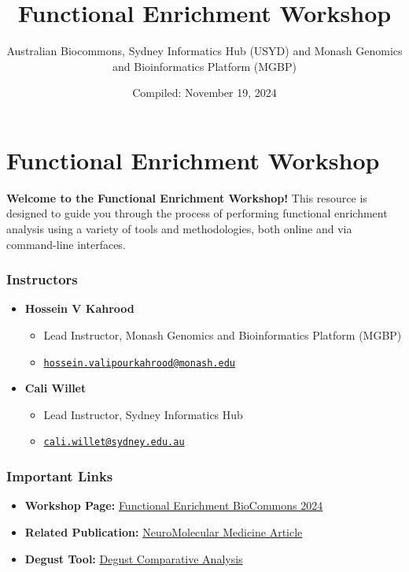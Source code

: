 \documentclass[
]{book}
\title{Functional Enrichment Workshop}
\author{Australian Biocommons, Sydney Informatics Hub (USYD) and Monash Genomics and Bioinformatics Platform (MGBP)}
\date{Compiled: November 19, 2024}
\providecommand{\tightlist}{%
  \setlength{\itemsep}{0pt}\setlength{\parskip}{0pt}}
\begin{document}
\maketitle

{
\setcounter{tocdepth}{1}
\tableofcontents
}
\hypertarget{functional-enrichment-workshop}{%
\chapter{Functional Enrichment Workshop}\label{functional-enrichment-workshop}}

\textbf{Welcome to the Functional Enrichment Workshop!} This resource is designed to guide you through the process of performing functional enrichment analysis using a variety of tools and methodologies, both online and via command-line interfaces.

\hypertarget{instructors}{%
\subsection{Instructors}\label{instructors}}

\begin{itemize}
\tightlist
\item
  \textbf{Hossein V Kahrood}

  \begin{itemize}
  \tightlist
  \item
    Lead Instructor, Monash Genomics and Bioinformatics Platform (MGBP)
  \item
    \href{mailto:hossein.valipourkahrood@monash.edu}{\nolinkurl{hossein.valipourkahrood@monash.edu}}
  \end{itemize}
\item
  \textbf{Cali Willet}

  \begin{itemize}
  \tightlist
  \item
    Lead Instructor, Sydney Informatics Hub
  \item
    \href{mailto:cali.willet@sydney.edu.au}{\nolinkurl{cali.willet@sydney.edu.au}}
  \end{itemize}
\end{itemize}

\hypertarget{important-links}{%
\subsection{Important Links}\label{important-links}}

\begin{itemize}
\tightlist
\item
  \textbf{Workshop Page:} \href{https://monashbioinformaticsplatform.github.io/Functional_Enrichment_BioCommons_2024/}{Functional Enrichment BioCommons 2024}
\item
  \textbf{Related Publication:} \href{https://link.springer.com/article/10.1007\%2Fs10571-016-0403-y}{NeuroMolecular Medicine Article}
\item
  \textbf{Degust Tool:} \href{https://degust.erc.monash.edu/degust/compare.html?code=5b2c7805ab8f8c5f2dc8c72e61b049b0\#/?plot=mds}{Degust Comparative Analysis}
\end{itemize}
\end{document}
